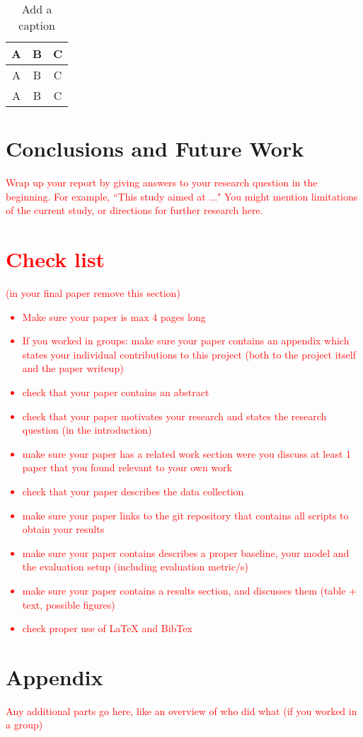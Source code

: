 \documentclass[11pt]{article}
\begin{document}
\begin{table}[hbtp]\centering
\begin{tabular}{|ccc|}
\hline
A & B & C\\
\hline
A & B & C\\
A & B & C\\
\hline
\end{tabular}
\caption{Add a caption}
\label{tbl:results}
\end{table}

\section{Conclusions and Future Work}

\textcolor{red}{Wrap up your report by giving answers to your research question in the beginning. For example, ``This study aimed at ..." You might mention limitations of the current study, or directions for further research here.}


\section*{\textcolor{red}{Check list}}
\textcolor{red}{(in your final paper remove this section)}
\textcolor{red}{
\begin{itemize}
\item Make sure your paper is max 4 pages long
\item If you worked in groups: make sure your paper contains an appendix which states your individual contributions to this project (both to the project itself and the paper writeup)
\item check that your paper contains an abstract
\item check that your paper motivates your research and states the research question (in the introduction)
\item make sure your paper has a related work section were you discuss at least 1 paper that you found relevant to your own work
\item check that your paper describes the data collection
\item make sure your paper links to the git repository that contains all scripts to obtain your results
\item make sure your paper contains describes a proper baseline, your model and the evaluation setup (including evaluation metric/s)
\item make sure your paper contains a results section, and discusses them (table + text, possible figures)
\item check proper use of \LaTeX{} and BibTex
\end{itemize}
}

\section*{Appendix}


\textcolor{red}{ Any additional parts go here, like an overview of who did what (if you worked in a group)}



\end{document}
